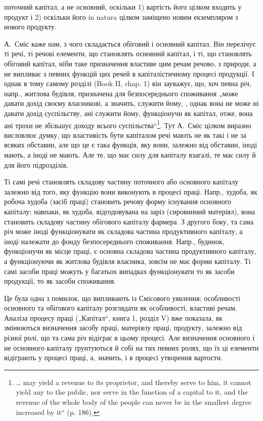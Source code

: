 \parcont{}  %
поточний капітал, а не основний, оскільки 1) вартість його цілком входить
у продукт і 2) оскільки його in natura цілком заміщено новим екземпляром
з нового продукту.

А.~Сміс каже нам, з чого складається обіговий і основний капітал.
Він перелічує ті речі, ті речові елементи, що становлять основний капітал,
і ті, що становлять обіговий капітал, ніби таке призначення властиве
цим речам речово, з природи, а не випливає з певних функцій
цих речей в капіталістичному процесі продукції. І однак в тому самому
розділі (Book II, chap. 1) він зауважує, що, хоч певна річ, напр., житлова
будівля, призначена для безпосереднього споживання „може давати
дохід своєму власникові, а значить, служити йому, , однак вона не може ні давати дохід суспільству, ані служити
йому, функціонучи як капітал, отже, вона ані трохи не збільшує доходу
всього суспільства“\footnote*{
\dots{} may yield a revenue to its proprietor, and thereby serve  to him, it cannot yield any to the public, nor serve in the function
of a capital to it, and the revenue of the whole body of the people can never be
in the smallest degree increased by it“ (p. 186).
}. Тут А.~Сміс цілком виразно висловлює думку, що
властивість бути капіталом речі мають не як такі і не за всяких обставин,
але що це є така функція, яку вони, залежно від обставин, іноді мають,
а іноді не мають. Але те, що має силу для капіталу взагалі, те має
силу й для його підрозділів.

Ті самі речі становлять складову частину поточного або основного
капіталу залежно від того, яку функцію вони виконують в процесі праці.
Напр., худоба, як робоча худоба (засіб праці) становить речову форму
існування основного капіталу; навпаки, як худоба, відгодовувана на
заріз (сировинний матеріял), вона становить складову частину обігового
капіталу фармера. З другого боку, та сама річ може іноді функціонувати
як складова частина продуктивного капіталу, а іноді належати до
фонду безпосереднього споживання. Напр., будинок, функціонучи як місце
праці, є основна складова частина продуктивного капіталу, а функціонуючи
як житлова будівля власника, зовсім не має форми капіталу.
Ті самі засоби праці можуть у багатьох випадках функціонувати то як
засоби продукції, то як засоби споживання.

Це була одна з помилок, що випливають із Смісового уявлення: особливості
основного та обігового капіталу розглядати як особливості,
властиві речам. Аналіза процесу праці („Капітал“, книга 1, розділ V)
вже показала, як змінюються визначення засобу праці, матеріялу праці,
продукту, залежно від різної ролі, що та сама річ відіграє в цьому
процесі. Але визначення основного і не основного капіталу ґрунтуються
й собі на тих певних ролях, що їх ці елементи відіграють у процесі праці,
а, значить, і в процесі утворення вартости.
